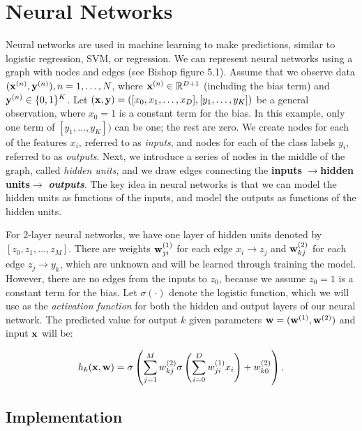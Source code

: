 
\section{Neural Networks}\label{sec:neural_networks}

Neural networks are used in machine learning to make predictions, similar to logistic regression, SVM, or regression.  We can represent neural networks using a graph with nodes and edges (see Bishop figure 5.1).  Assume that we observe data $(\boldsymbol{\mathbf{x}}^{(n)},\boldsymbol{\mathbf{y}}^{(n)}), n = 1, \ldots, N$,  where $\boldsymbol{\mathbf{x}}^{(n)} \in \mathbb{R}^{D+1}$ (including the bias term) and $\boldsymbol{\mathbf{y}}^{(n)} \in \{0,1\}^K$.  Let $(\boldsymbol{\mathbf{x}},\boldsymbol{\mathbf{y}}) = ([x_0, x_1, \ldots, x_D],[y_1, \ldots, y_K])$ be a general observation, where $x_0 = 1$ is a constant term for the bias.  In this example, only one term of $[y_1, \ldots, y_K])$ can be one; the rest are zero. We create nodes for each of the features $x_i$, referred to as \emph{inputs}, and nodes for each of the class labels $y_i$, referred to as \emph{outputs}.  Next, we introduce a series of nodes in the middle of the graph, called \emph{hidden units}, and we draw edges connecting the {\bf inputs} $\rightarrow ${\bf hidden units}$ \rightarrow$ \emph{\bf outputs}.  The key idea in neural networks is that we can model the hidden units as functions of the inputs, and model the outputs as functions of the hidden units.   

For 2-layer neural networks, we have one layer of hidden units denoted by $[z_0, z_1,\ldots, z_M]$.   There are weights $\boldsymbol{\mathbf{w}}^{(1)}_{ji}$ for each edge $x_i \rightarrow z_j$ and $\boldsymbol{\mathbf{w}}^{(2)}_{kj}$ for each edge $z_j \rightarrow y_k$, which are unknown and will be learned through training the model.  However, there are no edges from the inputs to $z_0$, because we assume $z_0 = 1$ is a constant term for the bias.  Let $\sigma(\cdot)$ denote the logistic function, which we will use as the \emph{activation function} for both the hidden and output layers of our neural network.  The predicted value for output $k$ given parameters $\boldsymbol{\mathbf{w}} = (\boldsymbol{\mathbf{w}}^{(1)}, \boldsymbol{\mathbf{w}}^{(2)})$ and input $\boldsymbol{\mathbf{x}}$ will be:

\begin{equation}
h_{k}(\boldsymbol{\mathbf{x}},\boldsymbol{\mathbf{w}}) = \sigma\left(\sum_{j=1}^{M} w^{(2)}_{kj} \sigma\left(\sum_{i=0}^{D} w^{(1)}_{ji} x_i\right)  + w_{k0}^{(2)} \right).
\end{equation}

\subsection{Implementation}

